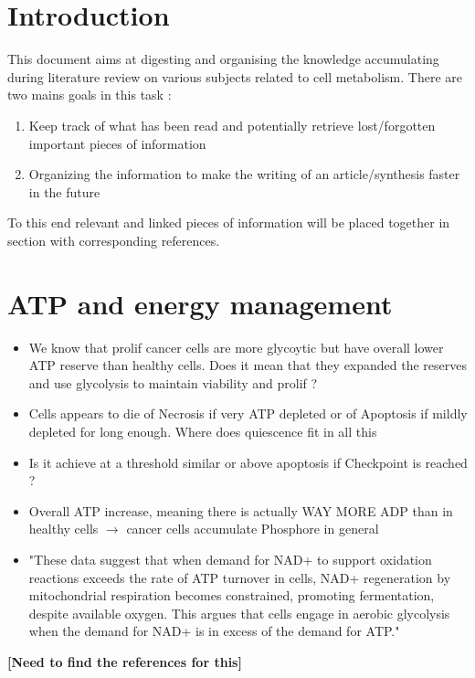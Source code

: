 \documentclass[11pt,a4paper]{article}
\begin{document}
\tableofcontents

\section{Introduction}
This document aims at digesting and organising the knowledge accumulating during literature review on various subjects related to cell metabolism. There are two mains goals in this task : 
\begin{enumerate}
\item Keep track of what has been read and potentially retrieve lost/forgotten important pieces of information
\item Organizing the information to make the writing of an article/synthesis faster in the future
\end{enumerate}
To this end relevant and linked pieces of information will be placed together in section with corresponding references.


\section{ATP and energy management}
\begin{itemize}
\item We know that prolif cancer cells are more glycoytic but have overall lower ATP reserve than healthy cells. Does it mean that they expanded the reserves and use glycolysis to maintain viability and prolif ? 
\item Cells appears to die of Necrosis if very ATP depleted or of Apoptosis if mildly depleted for long enough.  Where does quiescence fit in all this 
\item Is it achieve at a threshold similar or above apoptosis if Checkpoint is reached ? 
\item Overall ATP increase, meaning there is actually WAY MORE ADP than in healthy cells $\rightarrow$ cancer cells accumulate Phosphore in general
\item "These data suggest that when demand for NAD+ to support oxidation reactions exceeds the rate of ATP turnover in cells, NAD+ regeneration by mitochondrial respiration becomes constrained, promoting fermentation, despite available oxygen. This argues that cells engage in aerobic glycolysis when the demand for NAD+ is in excess of the demand for ATP."\cite{Luengo2020}
\end{itemize}
\textbf{[Need to find the references for this]}
\end{document}

